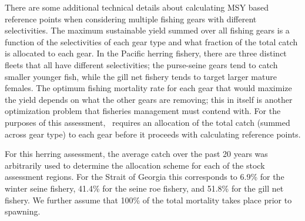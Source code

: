 
There are some additional technical details about calculating MSY based reference points when considering multiple fishing gears with different selectivities.  The maximum sustainable yield summed over all fishing gears is a function of the selectivities of each gear type and what fraction of the total catch is allocated to each gear.  In the Pacific herring fishery, there are three distinct fleets that all have different selectivities; the purse-seine gears tend to catch smaller younger fish, while the gill net fishery tends to target larger mature females.  The optimum fishing mortality rate for each gear that would maximize the yield depends on what the other gears are removing; this in itself is another optimization problem that fisheries management must contend with.  For the purposes of this assessment, \iscam\ requires an allocation of the total catch (summed across gear type) to each gear before it proceeds with calculating reference points.

For this herring assessment, the average catch over the past 20 years was arbitrarily used to determine the allocation scheme for each of the stock assessment regions.  For the Strait of Georgia this corresponds to 6.9\% for the winter seine fishery, 41.4\% for the seine roe fishery, and 51.8\% for the gill net fishery.  We further assume that 100\% of the total mortality takes place prior to spawning.


